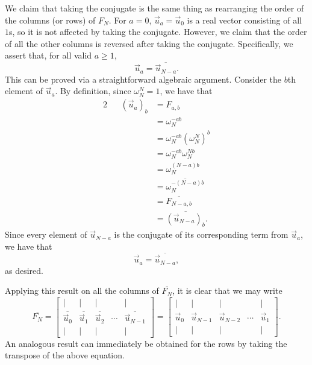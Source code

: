 \documentclass[letterpaper]{article}
\theoremstyle{remark}
\newcommand{\mat}[1]{\ensuremath{\begin{bmatrix}#1\end{bmatrix}}}
\newcommand{\eqn}[1]{\begin{alignat*}{2}#1\end{alignat*}}
\begin{document}
We claim that taking the conjugate is the same thing as rearranging the order of the columns (or rows) of $F_N$. For $a = 0$, $\vec{u}_a = \vec{u}_0$ is a real vector consisting of all $1$s, so it is not affected by taking the conjugate. However, we claim that the order of all the other columns is reversed after taking the conjugate. Specifically, we assert that, for all valid $a \ge 1$,
\[
    \vec{u}_a = \overline{\vec{u}_{N - a}}.
\]
This can be proved via a straightforward algebraic argument. Consider the $b$th element of $\vec{u}_a$. By definition, since $\omega_N^N = 1$, we have that
\eqn{
    && (\vec{u}_a)_b &= F_{a, b} \\
    &&&= \omega_N^{-ab} \\
    &&&= \omega_N^{-ab} (\omega_N^{N})^b \\
    &&&= \omega_N^{-ab} \omega_N^{Nb} \\
    &&&= \omega_N^{(N - a)b} \\
    &&&= \overline{\omega_N^{-(N-a)b}} \\
    &&&= \overline{F_{N - a, b}} \\
    &&&= \overline{(\vec{u}_{N-a})_b}.
}
Since every element of $\vec{u}_{N-a}$ is the conjugate of its corresponding term from $\vec{u}_a$, we have that
\[
    \vec{u}_a = \overline{\vec{u}_{N-a}},
\]
as desired.

Applying this result on all the columns of $\overline{F_N}$, it is clear that we may write
\[
    \overline{F_N} = \mat{ | & | & | & & | \\ \overline{\vec{u}_0} & \overline{\vec{u}_1} & \overline{\vec{u}_2} & \cdots & \overline{\vec{u}_{N-1}} \\ | & | & | & & | } = \mat{ | & | & | & & | \\ \vec{u}_0 & \vec{u}_{N-1} & \vec{u}_{N-2} & \cdots & \vec{u}_1 \\ | & | & | & & | }.
\]
An analogous result can immediately be obtained for the rows by taking the transpose of the above equation.
\end{document}
